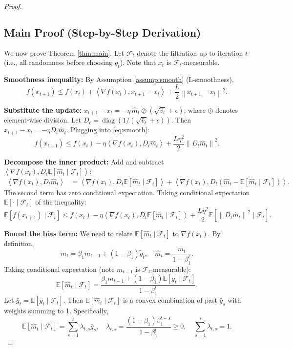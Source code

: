 \documentclass{article}
\newcommand{\E}{\mathbb{E}}
\newcommand{\norm}[1]{\left\| #1 \right\|}
\newcommand{\inner}[2]{\left\langle #1, #2 \right\rangle}
\newcommand{\step}[1]{\text{[Step #1]}}
\begin{document}
\begin{proof}
\subsection*{Main Proof (Step-by-Step Derivation)}

We now prove Theorem \ref{thm:main}. Let $\mathcal{F}_t$ denote the filtration up to iteration $t$ (i.e., all randomness before choosing $g_t$). Note that $x_t$ is $\mathcal{F}_t$-measurable.

\step{1} \textbf{Smoothness inequality:} By Assumption \ref{assump:smooth} (L-smoothness),
\begin{equation} \label{eq:smooth}
    f(x_{t+1}) \le f(x_t) + \inner{\nabla f(x_t)}{x_{t+1} - x_t} + \frac{L}{2} \norm{x_{t+1} - x_t}^2.
\end{equation}

\step{2} \textbf{Substitute the update:} $x_{t+1} - x_t = -\eta \, \hat{m}_t \oslash (\sqrt{\hat{v}_t} + \epsilon)$, where $\oslash$ denotes element-wise division. Let $D_t = \operatorname{diag}(1/(\sqrt{\hat{v}_t} + \epsilon))$. Then $x_{t+1} - x_t = -\eta D_t \hat{m}_t$. Plugging into \eqref{eq:smooth}:
\begin{equation}
    f(x_{t+1}) \le f(x_t) - \eta \inner{\nabla f(x_t)}{D_t \hat{m}_t} + \frac{L \eta^2}{2} \norm{D_t \hat{m}_t}^2.
\end{equation}

\step{3} \textbf{Decompose the inner product:} Add and subtract $\inner{\nabla f(x_t)}{D_t \E[\hat{m}_t \mid \mathcal{F}_t]}$:
\begin{align}
    \inner{\nabla f(x_t)}{D_t \hat{m}_t}
    &= \inner{\nabla f(x_t)}{D_t \E[\hat{m}_t \mid \mathcal{F}_t]} + \inner{\nabla f(x_t)}{D_t (\hat{m}_t - \E[\hat{m}_t \mid \mathcal{F}_t])}.
\end{align}
The second term has zero conditional expectation. Taking conditional expectation $\E[\cdot \mid \mathcal{F}_t]$ of the inequality:
\begin{equation} \label{eq:exp_smooth}
    \E[f(x_{t+1}) \mid \mathcal{F}_t] \le f(x_t) - \eta \inner{\nabla f(x_t)}{D_t \E[\hat{m}_t \mid \mathcal{F}_t]} + \frac{L \eta^2}{2} \E[\norm{D_t \hat{m}_t}^2 \mid \mathcal{F}_t].
\end{equation}

\step{4} \textbf{Bound the bias term:} We need to relate $\E[\hat{m}_t \mid \mathcal{F}_t]$ to $\nabla f(x_t)$. By definition,
\[
    m_t = \beta_1 m_{t-1} + (1-\beta_1) \tilde{g}_t, \quad \hat{m}_t = \frac{m_t}{1-\beta_1^t}.
\]
Taking conditional expectation (note $m_{t-1}$ is $\mathcal{F}_t$-measurable):
\[
    \E[\hat{m}_t \mid \mathcal{F}_t] = \frac{\beta_1 m_{t-1} + (1-\beta_1) \E[\tilde{g}_t \mid \mathcal{F}_t]}{1-\beta_1^t}.
\]
Let $\bar{g}_t = \E[\tilde{g}_t \mid \mathcal{F}_t]$. Then $\E[\hat{m}_t \mid \mathcal{F}_t]$ is a convex combination of past $\bar{g}_s$ with weights summing to 1. Specifically,
\[
    \E[\hat{m}_t \mid \mathcal{F}_t] = \sum_{s=1}^t \lambda_{t,s} \bar{g}_s, \quad \lambda_{t,s} = \frac{(1-\beta_1)\beta_1^{t-s}}{1-\beta_1^t} \ge 0, \quad \sum_{s=1}^t \lambda_{t,s} = 1.
\]


\end{proof}
\end{document}
